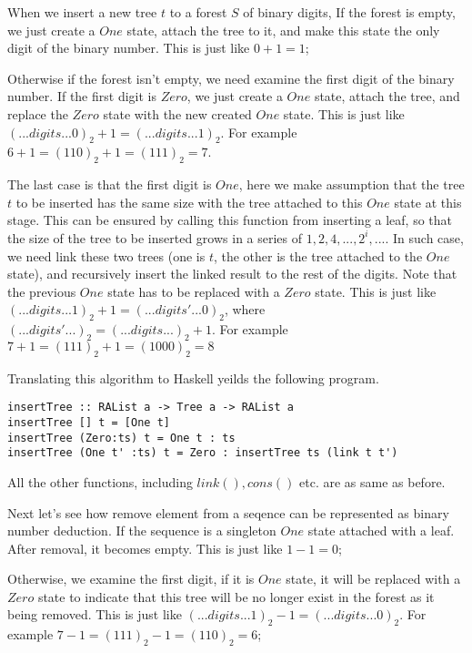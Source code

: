 \documentclass{article}
\begin{document}
When we insert a new tree $t$ to a forest $S$ of binary digits, If the forest is empty, we 
just create a $One$ state, attach the tree to it, and make this state the only 
digit of the binary number. This is just like $0 + 1 = 1$; 

Otherwise if the forest isn't empty, we need examine the first digit of the binary number. If the first digit
is $Zero$, we just create a $One$ state, attach the tree, and replace the $Zero$ state
with the new created $One$ state. This is just like $(...digits...0)_2 + 1 = (...digits...1)_2$.
For example $6 + 1 = (110)_2 + 1 = (111)_2 = 7$. 

The last case is that the first
digit is $One$, here we make assumption that the tree $t$ to be inserted has the 
same size with the tree attached to this $One$ state at this stage. 
This can be ensured by calling this function from inserting a leaf, so that the size
of the tree to be inserted grows in a series of $1, 2, 4, ..., 2^i, ...$. In such
case, we need link these two trees (one is $t$, the other is the tree attached to 
the $One$ state), and recursively insert the linked result to the rest of the digits.
Note that the previous $One$ state has to be replaced with a $Zero$ state. This
is just like $(...digits...1)_2 + 1 = (...digits'...0)_2$, where $(...digits'...)_2 = (...digits...)_2+1$.
For example $7 + 1 = (111)_2 + 1 = (1000)_2 = 8$

Translating this algorithm to Haskell yeilds the following program.

\begin{lstlisting}
insertTree :: RAList a -> Tree a -> RAList a
insertTree [] t = [One t]
insertTree (Zero:ts) t = One t : ts
insertTree (One t' :ts) t = Zero : insertTree ts (link t t')
\end{lstlisting}

All the other functions, including $link(), cons()$ etc. are as same as before.

Next let's see how remove element from a seqence can be represented as binary number
deduction. If the sequence is a singleton $One$ state attached with a leaf.
After removal, it becomes empty. This is just like $1 - 1 = 0$;

Otherwise, we examine the first digit, if
it is $One$ state, it will be replaced with a $Zero$ state to indicate that
this tree will be no longer exist in the forest as it being removed.
This is just like $(...digits...1)_2 - 1 = (...digits...0)_2$. For example
$7 - 1 = (111)_2 - 1 = (110)_2 = 6$;
\end{document}
